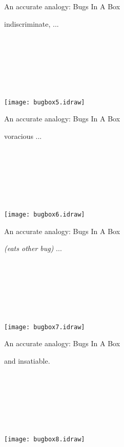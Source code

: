 \documentclass[bluish,slideColor,colorBG,pdf]{prosper}
\begin{document}
\begin{slide}[Replace]{An accurate analogy: Bugs In A Box}

\parbox[b]{1.5in}{indiscriminate, ...\\ \\ \\ \\ \\ \\ \\ } \hspace{0.3in}
\texttt{[image: bugbox5.idraw]}

\end{slide}

\begin{slide}[Replace]{An accurate analogy: Bugs In A Box}

\parbox[b]{1.5in}{voracious ...\\ \\ \\ \\ \\ \\ \\ } \hspace{0.3in}
\texttt{[image: bugbox6.idraw]}

\end{slide}

\begin{slide}[Replace]{An accurate analogy: Bugs In A Box}

\parbox[b]{1.5in}{{\it (eats other bug)} ...\\ \\ \\ \\ \\ \\ \\ } \hspace{0.3in}
\texttt{[image: bugbox7.idraw]}

\end{slide}

\begin{slide}[Replace]{An accurate analogy: Bugs In A Box}

\parbox[b]{1.5in}{and insatiable.\\ \\ \\ \\ \\ \\ \\ } \hspace{0.3in}
\texttt{[image: bugbox8.idraw]}

\end{slide}
\end{document}
